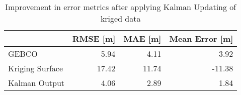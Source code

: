 \begin{table}
\centering
\caption{Improvement in error metrics after applying Kalman Updating of kriged data}
\label{tab:oahu2_gebco_raster_error}
\begin{tabular}{lrrr}
\toprule
 & RMSE [m] & MAE [m] & Mean Error [m] \\
\midrule
GEBCO & 5.94 & 4.11 & 3.92 \\
Kriging Surface & 17.42 & 11.74 & -11.38 \\
Kalman Output & 4.06 & 2.89 & 1.84 \\
\bottomrule
\end{tabular}
\end{table}
